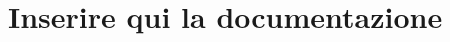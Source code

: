 \chapter{Inserire qui la documentazione}
\hypertarget{md_docs_2README}{}\label{md_docs_2README}
\label{md_docs_2README_autotoc_md0}%
%

